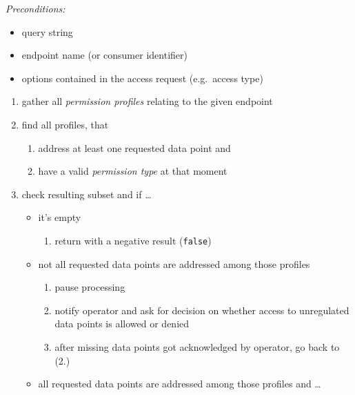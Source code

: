 \documentclass[12pt,english,a4paper,titlepage,cleardoublepage=empty,dottedtoc]{report}
\providecommand{\tightlist}{%
  \setlength{\itemsep}{0pt}\setlength{\parskip}{0pt}}
\begin{document}
\emph{Preconditions:}

\begin{itemize}
\tightlist
\item
  query string
\item
  endpoint name (or consumer identifier)
\item
  options contained in the access request (e.g.~access type)
\end{itemize}

\begin{enumerate}
\def\labelenumi{\arabic{enumi}.}
\item
  gather all \emph{permission profiles} relating to the given endpoint
\item
  find all profiles, that

  \begin{enumerate}
  \def\labelenumii{\alph{enumii})}
  \tightlist
  \item
    address at least one requested data point and
  \item
    have a valid \emph{permission type} at that moment
  \end{enumerate}
\item
  check resulting subset and if \ldots{}

  \begin{itemize}
  \tightlist
  \item
    it's empty

    \begin{enumerate}
    \def\labelenumii{\arabic{enumii})}
    \tightlist
    \item
      return with a negative result (\texttt{false})
    \end{enumerate}
  \item
    not all requested data points are addressed among those profiles

    \begin{enumerate}
    \def\labelenumii{\arabic{enumii})}
    \tightlist
    \item
      pause processing
    \item
      notify operator and ask for decision on whether access to
      unregulated data points is allowed or denied
    \item
      after missing data points got acknowledged by operator, go back to
      (2.)
    \end{enumerate}
  \item
    all requested data points are addressed among those profiles and
    \ldots{}


\end{itemize}
\end{enumerate}
\end{document}
